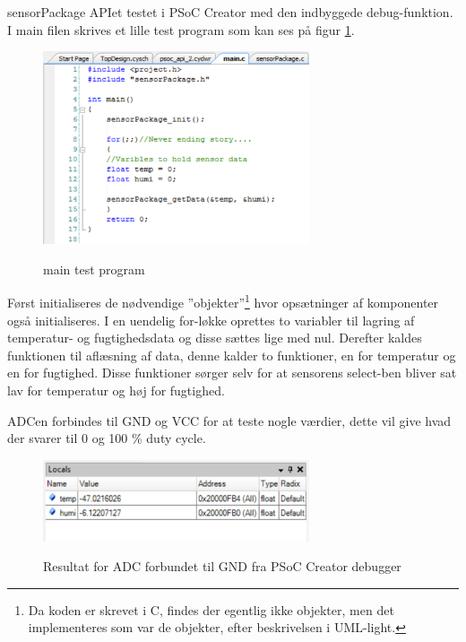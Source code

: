 
sensorPackage APIet testet i PSoC Creator med den indbyggede debug-funktion. I main filen skrives et lille test program som kan ses på figur \ref{lab:sht_testmain}.

\begin{figure}[htb]
\centering
{\includegraphics[width=0.70\textwidth]{filer/modultest/Billeder/psoc_testmain}}
\caption{main test program}
\label{lab:sht_testmain}
\end{figure}

Først initialiseres de nødvendige ''objekter''\footnote{Da koden er skrevet i C, findes der egentlig ikke objekter, men det implementeres som var de objekter, efter beskrivelsen i UML-light.} hvor opsætninger af komponenter også initialiseres. I en uendelig for-løkke oprettes to variabler til lagring af temperatur- og fugtighedsdata og disse sættes lige med nul. Derefter kaldes funktionen til aflæsning af data, denne kalder to funktioner, en for temperatur og en for fugtighed. Disse funktioner sørger selv for at sensorens select-ben bliver sat lav for temperatur og høj for fugtighed. 

ADCen forbindes til GND og VCC for at teste nogle værdier, dette vil give hvad der svarer til 0 og 100 \% duty cycle. 
  
\begin{figure}[htb]
\centering
{\includegraphics[width=0.70\textwidth]{filer/modultest/Billeder/psoc_api_test1}}
\caption{Resultat for ADC forbundet til GND fra PSoC Creator debugger}
\label{lab:sht_api_test1}
\end{figure}

